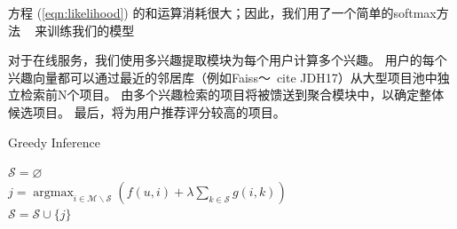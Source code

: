 方程 (\ref{eqn:likelihood}) 的和运算消耗很大；因此，我们用了一个简单的softmax方法 ~\cite{jean2014using, covington2016deep} 来训练我们的模型

对于在线服务，我们使用多兴趣提取模块为每个用户计算多个兴趣。 用户的每个兴趣向量都可以通过最近的邻居库（例如Faiss〜\ cite {JDH17}）从大型项目池中独立检索前N个项目。 由多个兴趣检索的项目将被馈送到聚合模块中，以确定整体候选项目。 最后，将为用户推荐评分较高的项目。




\begin{algorithm}[t]
	\caption{Greedy Inference \label{algo:greedy_infer}}
	$\mathcal{S} = \varnothing$ \\
     {
        $j = \operatorname{argmax}_{i \in \mathcal{M} \backslash \mathcal{S}} \left( f(u, i) + \lambda \sum_{k \in \mathcal{S}} g(i,k) \right)$ \\
        $\mathcal{S} = \mathcal{S} \cup \{j\}$
    }
\end{algorithm}

